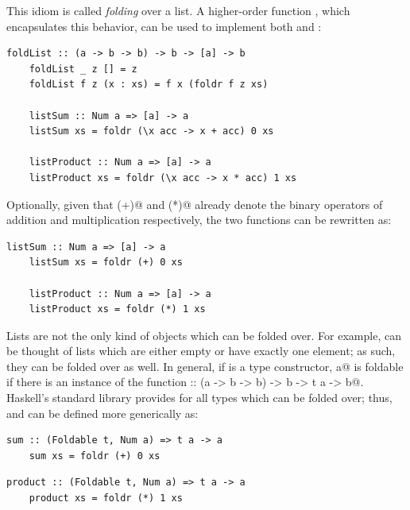 \documentclass[UdineBachThesis,american,11pt]{PhdThesis}
\begin{document}
  This idiom is called \emph{folding} over a list. A higher-order function
  \lstinline@foldList@, which encapsulates this behavior, can be used to
  implement both \lstinline@listSum@ and \lstinline@listProduct@:

  \begin{lstlisting}[gobble=4,basicstyle=\ttfamily\small]
    foldList :: (a -> b -> b) -> b -> [a] -> b
    foldList _ z [] = z
    foldList f z (x : xs) = f x (foldr f z xs)

    listSum :: Num a => [a] -> a
    listSum xs = foldr (\x acc -> x + acc) 0 xs

    listProduct :: Num a => [a] -> a
    listProduct xs = foldr (\x acc -> x * acc) 1 xs
  \end{lstlisting}

  Optionally, given that \lstinline@(+)@ and \lstinline@(*)@ already denote the
  binary operators of addition and multiplication respectively, the two
  functions can be rewritten as:

  \begin{lstlisting}[gobble=4,basicstyle=\ttfamily\small]
    listSum :: Num a => [a] -> a
    listSum xs = foldr (+) 0 xs

    listProduct :: Num a => [a] -> a
    listProduct xs = foldr (*) 1 xs
  \end{lstlisting}

  Lists are not the only kind of objects which can be folded over. For example,
  \lstinline@Maybe@s can be thought of lists which are either empty or have
  exactly one element; as such, they can be folded over as well. In general, if
  \lstinline@t@ is a type constructor, \lstinline@t a@ is foldable if there is
  an instance of the function
  \lstinline@foldr :: (a -> b -> b) -> b -> t a -> b@. Haskell's standard
  library provides \lstinline@foldr@ for all types which can be folded over;
  thus, \lstinline@listSum@ and \lstinline@listProduct@ can be defined more
  generically as:

  \begin{lstlisting}[gobble=4,basicstyle=\ttfamily\small]
    sum :: (Foldable t, Num a) => t a -> a
    sum xs = foldr (+) 0 xs
  \end{lstlisting}

  \newpage

  \begin{lstlisting}[gobble=4,basicstyle=\ttfamily\small]
    product :: (Foldable t, Num a) => t a -> a
    product xs = foldr (*) 1 xs
  \end{lstlisting}
\end{document}
